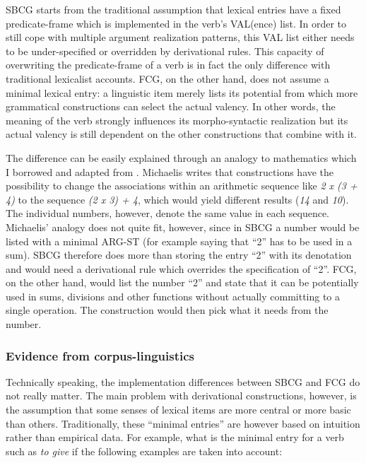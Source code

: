 SBCG starts from the traditional assumption that lexical entries have a fixed predicate-frame which is implemented in the verb's VAL(ence) list. In order to still cope with multiple argument realization patterns, this VAL list either needs to be under-specified or overridden by derivational rules. This capacity of overwriting the predicate-frame of a verb is in fact the only difference with traditional lexicalist accounts. FCG, on the other hand, does not assume a minimal lexical entry: a linguistic item merely lists its potential from which more grammatical constructions can select the actual valency. In other words, the meaning of the verb strongly influences its morpho-syntactic realization but its actual valency is still dependent on the other constructions that combine with it.

The difference can be easily explained through an analogy to mathematics which I borrowed and adapted from \citet{michaelis06complementation}. Michaelis writes that constructions have the possibility to change the associations within an arithmetic sequence like {\em 2 x (3 + 4)} to the sequence {\em (2 x 3) + 4}, which would yield different results ({\em 14} and {\em 10}). The individual numbers, however, denote the same value in each sequence. Michaelis' analogy does not quite fit, however, since in SBCG a number would be listed with a minimal ARG-ST (for example saying that ``2'' has to be used in a sum). SBCG therefore does more than storing the entry ``2'' with its denotation and would need a derivational rule which overrides the specification of ``2''. FCG, on the other hand, would list the number ``2'' and state that it can be potentially used in sums, divisions and other functions without actually committing to a single operation. The construction would then pick what it needs from the number.


\subsubsection{Evidence from corpus-linguistics}
Technically speaking, the implementation differences between SBCG and FCG do not really matter. The main problem with derivational constructions, however, is the assumption that some senses of lexical items are more central or more basic than others. Traditionally, these ``minimal entries'' are however based on intuition rather than empirical data. For example, what is the minimal entry for a verb such as {\em to give} if the following examples are taken into account:

